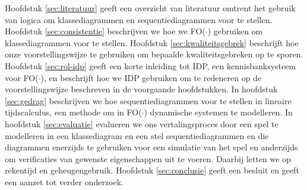 Hoofdstuk \ref{sec:literatuur} geeft een overzicht van literatuur omtrent het gebruik van logica om klassediagrammen en sequentiediagrammen voor te stellen. Hoofdstuk \ref{sec:consistentie} beschrijven we hoe we FO($\cdot$) gebruiken om klassediagrammen voor te stellen. Hoofdstuk \ref{sec:kwaliteitsgebrek} beschrijft hoe onze voorstellingswijze te gebruiken om bepaalde kwaliteitsgebreken op te sporen. Hoofdstuk \ref{sec:rol-idp} geeft een korte inleiding tot IDP\cite{DeCatBroes2014PLaa}, een kennisbanksysteem voor FO($\cdot$), en beschrijft hoe we IDP gebruiken om te redeneren op de voorstellingswijze beschreven in de voorgaande hoofdstukken. In hoofdstuk \ref{sec:gedrag} beschrijven we hoe sequentiediagrammen voor te stellen in lineaire tijdscalculus\cite{BogaertsBart2014Sdsu}, een methode om in FO($\cdot$) dynamische systemen te modelleren. In hoofdstuk \ref{sec:evaluatie} evalueren we ons vertalingsproces door een spel te modelleren in een klassediagram en een stel sequentiediagrammen en die diagrammen enerzijds te gebruiken voor een simulatie van het spel en anderzijds om verificaties van gewenste eigenschappen uit te voeren. Daarbij letten we op rekentijd en geheugengebruik. Hoofdstuk \ref{sec:conclusie} geeft een besluit en geeft een aanzet tot verder onderzoek.